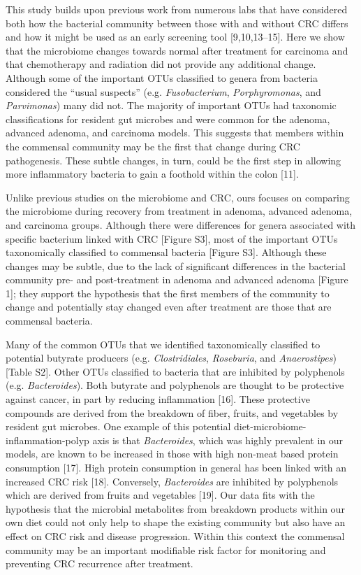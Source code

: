\documentclass[12pt,]{article}
\begin{document}
This study builds upon previous work from numerous labs that have
considered both how the bacterial community between those with and
without CRC differs and how it might be used as an early screening tool
{[}9,10,13--15{]}. Here we show that the microbiome changes towards
normal after treatment for carcinoma and that chemotherapy and radiation
did not provide any additional change. Although some of the important
OTUs classified to genera from bacteria considered the ``usual
suspects'' (e.g. \emph{Fusobacterium}, \emph{Porphyromonas}, and
\emph{Parvimonas}) many did not. The majority of important OTUs had
taxonomic classifications for resident gut microbes and were common for
the adenoma, advanced adenoma, and carcinoma models. This suggests that
members within the commensal community may be the first that change
during CRC pathogenesis. These subtle changes, in turn, could be the
first step in allowing more inflammatory bacteria to gain a foothold
within the colon {[}11{]}.

Unlike previous studies on the microbiome and CRC, ours focuses on
comparing the microbiome during recovery from treatment in adenoma,
advanced adenoma, and carcinoma groups. Although there were differences
for genera associated with specific bacterium linked with CRC {[}Figure
S3{]}, most of the important OTUs taxonomically classified to commensal
bacteria {[}Figure S3{]}. Although these changes may be subtle, due to
the lack of significant differences in the bacterial community pre- and
post-treatment in adenoma and advanced adenoma {[}Figure 1{]}; they
support the hypothesis that the first members of the community to change
and potentially stay changed even after treatment are those that are
commensal bacteria.

Many of the common OTUs that we identified taxonomically classified to
potential butyrate producers (e.g. \emph{Clostridiales},
\emph{Roseburia}, and \emph{Anaerostipes}) {[}Table S2{]}. Other OTUs
classified to bacteria that are inhibited by polyphenols (e.g.
\emph{Bacteroides}). Both butyrate and polyphenols are thought to be
protective against cancer, in part by reducing inflammation {[}16{]}.
These protective compounds are derived from the breakdown of fiber,
fruits, and vegetables by resident gut microbes. One example of this
potential diet-microbiome-inflammation-polyp axis is that
\emph{Bacteroides}, which was highly prevalent in our models, are known
to be increased in those with high non-meat based protein consumption
{[}17{]}. High protein consumption in general has been linked with an
increased CRC risk {[}18{]}. Conversely, \emph{Bacteroides} are
inhibited by polyphenols which are derived from fruits and vegetables
{[}19{]}. Our data fits with the hypothesis that the microbial
metabolites from breakdown products within our own diet could not only
help to shape the existing community but also have an effect on CRC risk
and disease progression. Within this context the commensal community may
be an important modifiable risk factor for monitoring and preventing CRC
recurrence after treatment.
\end{document}
